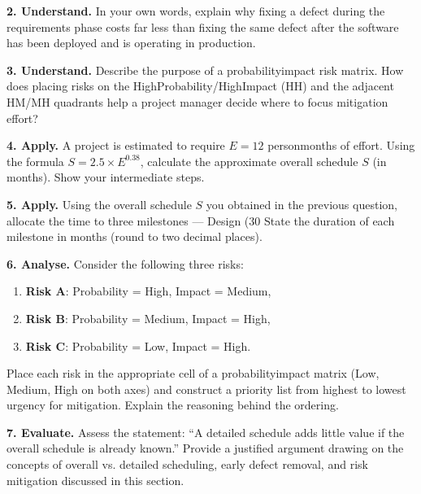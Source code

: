 \documentclass[12pt, a4paper]{article}
\begin{document}
\newpage
\textbf{2. Understand.}  
In your own words, explain why fixing a defect during the requirements phase costs far less than fixing the same defect after the software has been deployed and is operating in production.

\newpage
\textbf{3. Understand.}  
Describe the purpose of a probabilityimpact risk matrix. How does placing risks on the HighProbability/HighImpact (HH) and the adjacent HM/MH quadrants help a project manager decide where to focus mitigation effort?

\newpage
\textbf{4. Apply.}  
A project is estimated to require \(E = 12\) personmonths of effort.  
Using the formula \(S = 2.5 \times E^{0.38}\), calculate the approximate overall schedule \(S\) (in months). Show your intermediate steps.

\newpage
\textbf{5. Apply.}  
Using the overall schedule \(S\) you obtained in the previous question, allocate the time to three milestones --- Design (30 %
State the duration of each milestone in months (round to two decimal places).

\newpage
\textbf{6. Analyse.}  
Consider the following three risks:

\begin{enumerate}
  \item \textbf{Risk A}: Probability = High, Impact = Medium,
  \item \textbf{Risk B}: Probability = Medium, Impact = High,
  \item \textbf{Risk C}: Probability = Low, Impact = High.
\end{enumerate}

Place each risk in the appropriate cell of a probabilityimpact matrix (Low, Medium, High on both axes) and construct a priority list from highest to lowest urgency for mitigation.  Explain the reasoning behind the ordering.

\newpage
\textbf{7. Evaluate.}  
Assess the statement: ``A detailed schedule adds little value if the overall schedule is already known.''  
Provide a justified argument drawing on the concepts of overall vs. detailed scheduling, early defect removal, and risk mitigation discussed in this section.

\newpage

\end{document}
